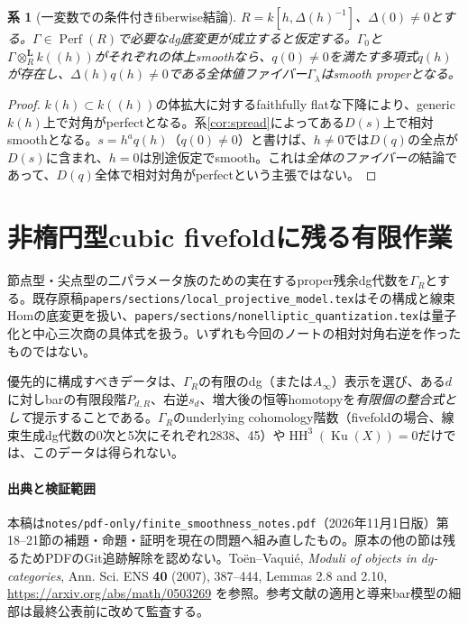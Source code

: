 \documentclass[a4paper,11pt]{ltjsarticle}
\newtheorem{corollary}[theorem]{系}
\theoremstyle{remark}
\newcommand{\Perf}{\operatorname{Perf}}
\newcommand{\otL}{\otimes^{\mathbf L}}
\newcommand{\HH}{\operatorname{HH}}
\begin{document}
\begin{corollary}[一変数での条件付きfiberwise結論]\label{cor:onevariable}
$R=k[h,\Delta(h)^{-1}]$、$\Delta(0)\neq0$とする。$\Gamma\in\Perf(R)$で必要なdg底変更が成立すると仮定する。$\Gamma_0$と$\Gamma\otL_Rk((h))$がそれぞれの体上smoothなら、$q(0)\neq0$を満たす多項式$q(h)$が存在し、$\Delta(h)q(h)\neq0$である全体値ファイバー$\Gamma_\lambda$はsmooth properとなる。
\end{corollary}
\begin{proof}
$k(h)\subset k((h))$の体拡大に対するfaithfully flatな下降により、generic $k(h)$上で対角がperfectとなる。系\ref{cor:spread}によってある$D(s)$上で相対smoothとなる。$s=h^a q(h)$（$q(0)\neq0$）と書けば、$h\neq0$では$D(q)$の全点が$D(s)$に含まれ、$h=0$は別途仮定でsmooth。これは\emph{全体のファイバーの}結論であって、$D(q)$全体で相対対角がperfectという主張ではない。
\end{proof}

\section{非楕円型cubic fivefoldに残る有限作業}
節点型・尖点型の二パラメータ族のための実在するproper残余dg代数を$\Gamma_R$とする。既存原稿\texttt{papers/sections/local\_projective\_model.tex}はその構成と線束Homの底変更を扱い、\texttt{papers/sections/nonelliptic\_quantization.tex}は量子化と中心三次商の具体式を扱う。いずれも今回のノートの相対対角右逆を作ったものではない。

優先的に構成すべきデータは、$\Gamma_R$の有限のdg（または$A_\infty$）表示を選び、ある$d$に対しbarの有限段階$P_{d,R}$、右逆$s_d$、増大後の恒等homotopyを\emph{有限個の整合式として}提示することである。$\Gamma_R$のunderlying cohomology階数（fivefoldの場合、線束生成dg代数の0次と5次にそれぞれ2838、45）や\(\HH^3(\operatorname{Ku}(X))=0\)だけでは、このデータは得られない。

\paragraph{出典と検証範囲}
本稿は\texttt{notes/pdf-only/finite\_smoothness\_notes.pdf}（2026年11月1日版）第18--21節の補題・命題・証明を現在の問題へ組み直したもの。原本の他の節は残るためPDFのGit追跡解除を認めない。Toën--Vaquié, \emph{Moduli of objects in dg-categories}, Ann. Sci. ENS \textbf{40} (2007), 387--444, Lemmas 2.8 and 2.10, \url{https://arxiv.org/abs/math/0503269} を参照。参考文献の適用と導来bar模型の細部は最終公表前に改めて監査する。
\end{document}
